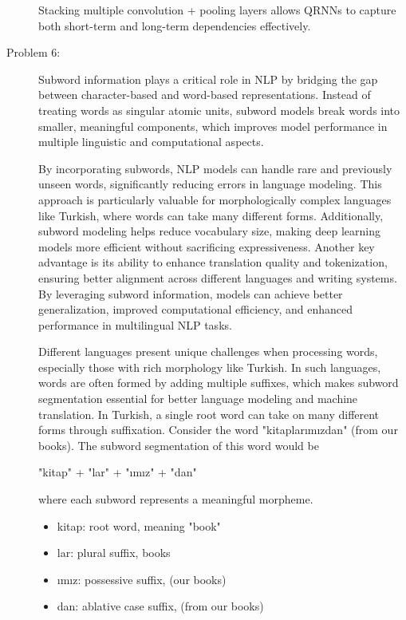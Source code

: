 \documentclass[10pt]{article}
\begin{document}
\begin{description}
Stacking multiple convolution + pooling layers allows QRNNs to capture both short-term and long-term dependencies effectively.

\pagebreak

\item[Problem 6:]  \hfill %

Subword information plays a critical role in NLP by bridging the gap between character-based and word-based representations.
Instead of treating words as singular atomic units, subword models break words into smaller, meaningful components, 
which improves model performance in multiple linguistic and computational aspects.

By incorporating subwords, NLP models can handle rare and previously unseen words, significantly reducing errors in language modeling. 
This approach is particularly valuable for morphologically complex languages like Turkish, where words can take many different forms. 
Additionally, subword modeling helps reduce vocabulary size, making deep learning models more efficient without sacrificing expressiveness.
Another key advantage is its ability to enhance translation quality and tokenization, ensuring better alignment across different languages and writing systems. 
By leveraging subword information, models can achieve better generalization, improved computational efficiency, and enhanced performance in multilingual NLP tasks.

Different languages present unique challenges when processing words, especially those with rich morphology like Turkish. 
In such languages, words are often formed by adding multiple suffixes, which makes subword segmentation essential for better language modeling and machine translation.
In Turkish, a single root word can take on many different forms through suffixation. Consider the word "kitaplarımızdan" (from our books). 
The subword segmentation of this word would be 

\begin{center}
"kitap" + "lar" + "ımız" + "dan"
\end{center}

where each subword represents a meaningful morpheme.

\begin{itemize}
    \item kitap: root word, meaning "book"
    \item lar: plural suffix, books
    \item ımız: possessive suffix, (our books)
    \item dan: ablative case suffix, (from our books) 
\end{itemize}


\end{description}
\end{document}
